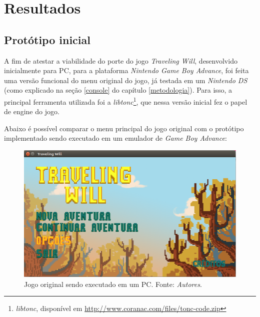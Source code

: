 \chapter[Resultados]{Resultados}

\section{Protótipo inicial}

A fim de atestar a viabilidade do porte do jogo \textit{Traveling Will}, desenvolvido inicialmente para PC, para a plataforma \textit{Nintendo Game Boy Advance}, foi feita uma versão funcional do menu original do jogo, já testada em um \textit{Nintendo DS} (como explicado na seção \ref{console} do capítulo \ref{metodologia}). Para isso, a principal ferramenta utilizada foi a \textit{libtonc}\footnote{\textit{libtonc}, disponível em \url{http://www.coranac.com/files/tonc-code.zip}}, que nessa versão inicial fez o papel de engine do jogo.

Abaixo é possível comparar o menu principal do jogo original com o protótipo implementado sendo executado em um emulador de \textit{Game Boy Advance}:

\begin{figure}[H]
 \centering \includegraphics[keepaspectratio=true,scale=0.6]{figuras/tw-original-1.eps}
   \caption[Jogo original sendo executado em um PC]
    {Jogo original sendo executado em um PC. Fonte: \textit{Autores}.}
   \label{tw-original-1}
\end{figure}

